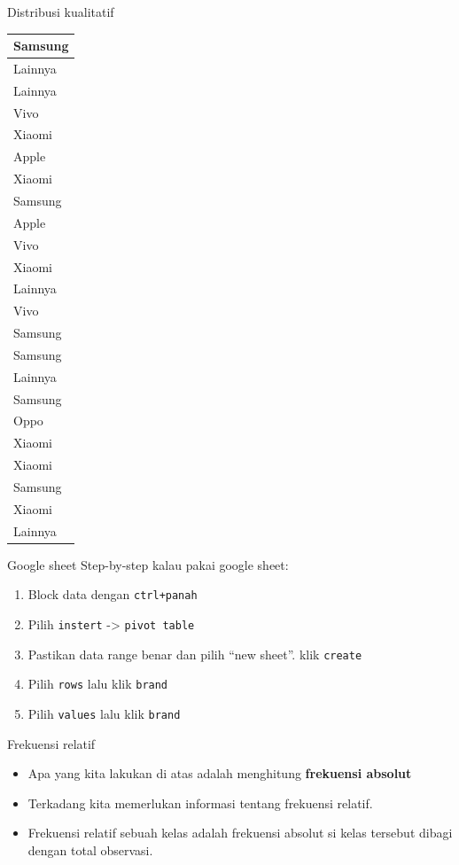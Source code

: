 \documentclass[
  ignorenonframetext,
]{beamer}
\providecommand{\tightlist}{%
  \setlength{\itemsep}{0pt}\setlength{\parskip}{0pt}}\usepackage{longtable,booktabs,array}
\begin{document}
\begin{frame}[s]{Distribusi kualitatif}
\begin{table}
\begin{tabular}[t]{l}
\hline
Samsung\\
\hline
Lainnya\\
\hline
Lainnya\\
\hline
Vivo\\
\hline
Xiaomi\\
\hline
Apple\\
\hline
Xiaomi\\
\hline
Samsung\\
\hline
Apple\\
\hline
Vivo\\
\hline
Xiaomi\\
\hline
Lainnya\\
\hline
Vivo\\
\hline
Samsung\\
\hline
Samsung\\
\hline
Lainnya\\
\hline
Samsung\\
\hline
Oppo\\
\hline
Xiaomi\\
\hline
Xiaomi\\
\hline
Samsung\\
\hline
Xiaomi\\
\hline
Lainnya\\
\hline
\end{tabular}
\end{table}
\end{frame}

\begin{frame}[fragile]{Google sheet}
\label{google-sheet}
Step-by-step kalau pakai google sheet:

\begin{enumerate}
\tightlist
\item
  Block data dengan \texttt{ctrl+panah}
\item
  Pilih \texttt{instert} -\textgreater{} \texttt{pivot\ table}
\item
  Pastikan data range benar dan pilih ``new sheet''. klik
  \texttt{create}
\item
  Pilih \texttt{rows} lalu klik \texttt{brand}
\item
  Pilih \texttt{values} lalu klik \texttt{brand}
\end{enumerate}
\end{frame}

\begin{frame}{Frekuensi relatif}
\label{frekuensi-relatif}
\begin{itemize}
\item
  Apa yang kita lakukan di atas adalah menghitung \textbf{frekuensi
  absolut}
\item
  Terkadang kita memerlukan informasi tentang frekuensi relatif.
\item
  Frekuensi relatif sebuah kelas adalah frekuensi absolut si kelas
  tersebut dibagi dengan total observasi.
\end{itemize}
\end{frame}
\end{document}
